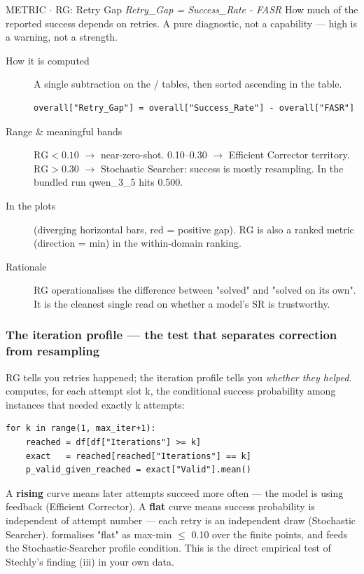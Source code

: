 \begin{bmmcard}{METRIC \(\cdot\) RG: Retry Gap}
\emph{Retry\_Gap = Success\_Rate - FASR}
How much of the reported success depends on retries. A pure diagnostic, not a capability --- high is a warning, not a strength.
\begin{description}
\item[How it is computed] A single subtraction on the / tables, then sorted ascending in the  table.

\begin{lstlisting}
overall["Retry_Gap"] = overall["Success_Rate"] - overall["FASR"]
\end{lstlisting}
\item[Range \& meaningful bands] \(\mathrm{RG}<0.10\) \(\rightarrow\) near-zero-shot. 0.10--0.30 \(\rightarrow\) Efficient Corrector territory. \(\mathrm{RG}>0.30\) \(\rightarrow\) Stochastic Searcher: success is mostly resampling. In the bundled run qwen\_3\_5 hits 0.500.
\item[In the plots] (diverging horizontal bars, red = positive gap). RG is also a ranked metric (direction = min) in the within-domain ranking.
\item[Rationale] RG operationalises the difference between "solved" and "solved on its own". It is the cleanest single read on whether a model's SR is trustworthy.
\end{description}
\end{bmmcard}

\subsubsection{The iteration profile --- the test that separates correction from resampling}

RG tells you retries happened; the iteration profile tells you \emph{whether they helped}. computes, for each attempt slot k, the conditional success probability among instances that needed exactly k attempts:

\begin{lstlisting}
for k in range(1, max_iter+1):
    reached = df[df["Iterations"] >= k]
    exact   = reached[reached["Iterations"] == k]
    p_valid_given_reached = exact["Valid"].mean()
\end{lstlisting}

A \textbf{rising} curve means later attempts succeed more often --- the model is using feedback (Efficient Corrector). A \textbf{flat} curve means success probability is independent of attempt number --- each retry is an independent draw (Stochastic Searcher). formalises "flat" as max-min \(\le\) 0.10 over the finite points, and feeds the Stochastic-Searcher profile condition. This is the direct empirical test of Stechly's finding (iii) in your own data.

